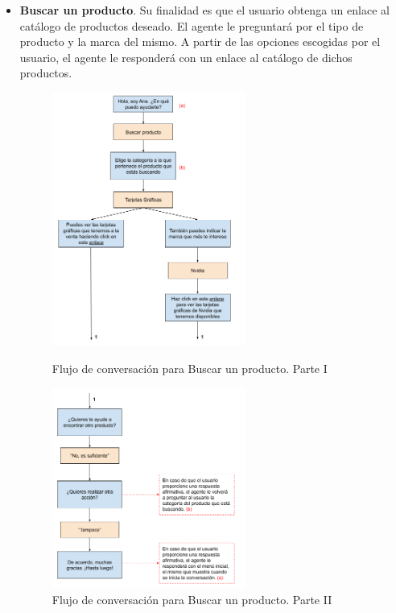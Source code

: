 \begin{itemize}
    \item \textbf{Buscar un producto}. Su finalidad es que el usuario obtenga un enlace al catálogo de productos deseado. El agente le preguntará por el tipo de producto y la marca del mismo. A partir de las opciones escogidas por el usuario, el agente le responderá con un enlace al catálogo de dichos productos.
    \begin{figure}
    \begin{center}
    	\includegraphics[width = 0.60\textwidth]{Figuras/Buscar producto (1).png}
    	\caption{\label{fig:buscarProducto1} Flujo de conversación para Buscar un producto. Parte I}
    	\includegraphics[width = 0.60\textwidth]{Figuras/Buscar producto (2).png}
    	\caption{\label{fig:buscarProducto2} Flujo de conversación para Buscar un producto. Parte II}
	\end{center}
    \end{figure}
    

\end{itemize}
